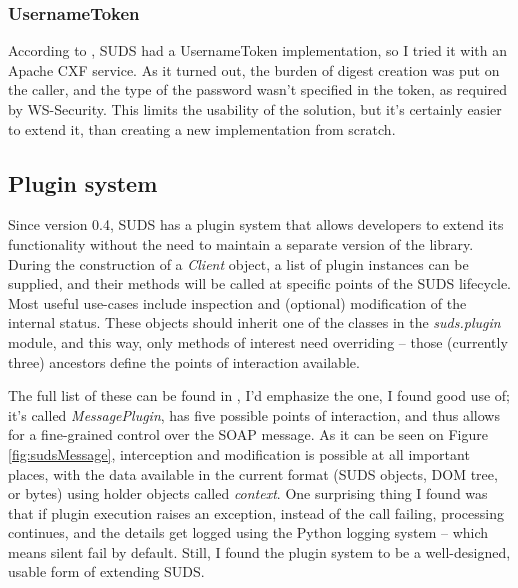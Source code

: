 \subsubsection{UsernameToken}
\label{sudsUsernameToken}

According to \cite{suds-doc}, SUDS had a UsernameToken implementation, so I tried it with an Apache CXF service. As it turned out, the burden of digest creation was put on the caller, and the type of the password wasn't specified in the token, as required by WS\hyp{}Security. This limits the usability of the solution, but it's certainly easier to extend it, than creating a new implementation from scratch.

\subsection{Plugin system}
\label{sudsPlugins}

Since version 0.4, SUDS has a plugin system that allows developers to extend its functionality without the need to maintain a separate version of the library. During the construction of a \emph{Client} object, a list of plugin instances can be supplied, and their methods will be called at specific points of the SUDS lifecycle. Most useful use-cases include inspection and (optional) modification of the internal status. These objects should inherit one of the classes in the \emph{suds.plugin} module, and this way, only methods of interest need overriding -- those (currently three) ancestors define the points of interaction available.

The full list of these can be found in \cite{suds-doc}, I'd emphasize the one, I found good use of; it's called \emph{MessagePlugin}, has five possible points of interaction, and thus allows for a fine-grained control over the SOAP message. As it can be seen on Figure \ref{fig:sudsMessage}, interception and modification is possible at all important places, with the data available in the current format (SUDS objects, DOM tree, or bytes) using holder objects called \emph{context}. One surprising thing I found was that if plugin execution raises an exception, instead of the call failing, processing continues, and the details get logged using the Python logging system -- which means silent fail by default. Still, I found the plugin system to be a well-designed, usable form of extending SUDS.
